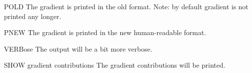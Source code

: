 \begin{keywordlist}
\item[POLD]
The gradient is printed in the old format. Note: by default gradient
is not printed any longer.
\item[PNEW]
The gradient is printed in the new human-readable format.
\item[VERBose]
The output will be a bit more verbose.
\item[SHOW gradient contributions]
The gradient contributions will be printed.
\end{keywordlist}


